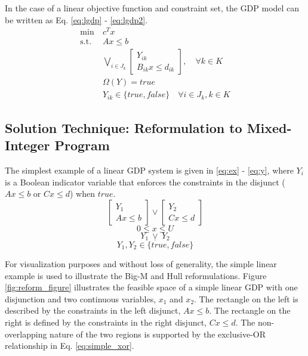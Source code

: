 \documentclass{juliacon}
\begin{document}
In the case of a linear objective function and constraint set, the GDP model can be written as Eq. \eqref{eq:lgdp} - \eqref{eq:lgdp2}.
\begin{align}
    \label{eq:lgdp}
    \min \ & c^Tx \\
    \text{s.t.} \ &Ax \leq b \\
    &\bigvee_{i \in J_k}
    \begin{bmatrix}
        Y_{ik} \\
       B_{ik}x \leq d_{ik}
    \end{bmatrix}, \quad \forall k \in K \\
    & \Omega(Y) = true \\
    \label{eq:lgdp2}
    & Y_{ik} \in \{true, false\} \quad \forall i \in J_k, k \in K
\end{align}
\vskip 6pt

\subsection{Solution Technique: Reformulation to Mixed-Integer Program}
The simplest example of a linear GDP system is given in \eqref{eq:ex} - \eqref{eq:y}, where $Y_i$ is a Boolean indicator variable that enforces the constraints in the disjunct ($Ax \le b$ or $Cx \le d$) when $true$.
\vskip 6pt
\begin{equation}
    \label{eq:ex}
    \begin{bmatrix}
    Y_1 \\ Ax \leq b
    \end{bmatrix}
    \lor
    \begin{bmatrix}
        Y_2 \\ Cx \leq d
    \end{bmatrix}
\end{equation}
\begin{equation}
    \label{eq:x}
    0 \leq x \leq U
\end{equation}
\begin{equation}
    \label{eq:simple_xor}
    Y_1 \ \underline{\vee} \ Y_2
\end{equation}
\begin{equation}
    \label{eq:y}
    Y_1, Y_2 \in \{true, false\}
\end{equation}
\vskip 6pt

For visualization purposes and without loss of generality, the simple linear example is used to illustrate the Big-M and Hull reformulations. Figure \ref{fig:reform_figure} illustrates the feasible space of a simple linear GDP with one disjunction and two continuous variables, $x_1$ and $x_2$. The rectangle on the left is described by the constraints in the left disjunct, $Ax \leq b$. The rectangle on the right is defined by the constraints in the right disjunct, $Cx \le d$. The non-overlapping nature of the two regions is supported by the exclusive-OR relationship in Eq. \eqref{eq:simple_xor}.
\end{document}
